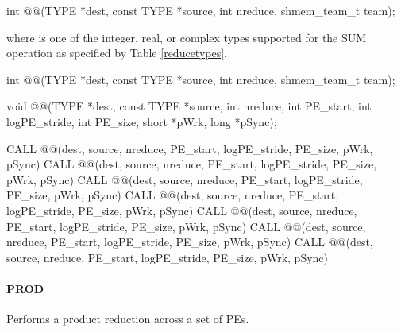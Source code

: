 \begin{apidefinition}
{\color{Green}
\begin{C11synopsis}
int @@(TYPE *dest, const TYPE *source, int nreduce, shmem_team_t team);
\end{C11synopsis}
where \TYPE{} is one of the integer, real, or complex types supported for the SUM operation as specified by Table \ref{reducetypes}.
}

\begin{Csynopsis}
\end{Csynopsis}
{\color{Green}
\begin{CsynopsisCol}
int @@(TYPE *dest, const TYPE *source, int nreduce, shmem_team_t team);
\end{CsynopsisCol}
}
\begin{DeprecateBlock}
\begin{CsynopsisCol}
void @@(TYPE *dest, const TYPE *source, int nreduce, int PE_start, int logPE_stride, int PE_size, short *pWrk, long *pSync);
\end{CsynopsisCol}
\end{DeprecateBlock}

\begin{Fsynopsis}
CALL @@(dest, source, nreduce, PE_start, logPE_stride, PE_size, pWrk, pSync)
CALL @@(dest, source, nreduce, PE_start, logPE_stride, PE_size, pWrk, pSync)
CALL @@(dest, source, nreduce, PE_start, logPE_stride, PE_size, pWrk, pSync)
CALL @@(dest, source, nreduce, PE_start, logPE_stride, PE_size, pWrk, pSync)
CALL @@(dest, source, nreduce, PE_start, logPE_stride, PE_size, pWrk, pSync)
CALL @@(dest, source, nreduce, PE_start, logPE_stride, PE_size, pWrk, pSync)
CALL @@(dest, source, nreduce, PE_start, logPE_stride, PE_size, pWrk, pSync)
\end{Fsynopsis}

\paragraph{PROD}
Performs a product reduction across a set of \acp{PE}.\newline


\end{apidefinition}
